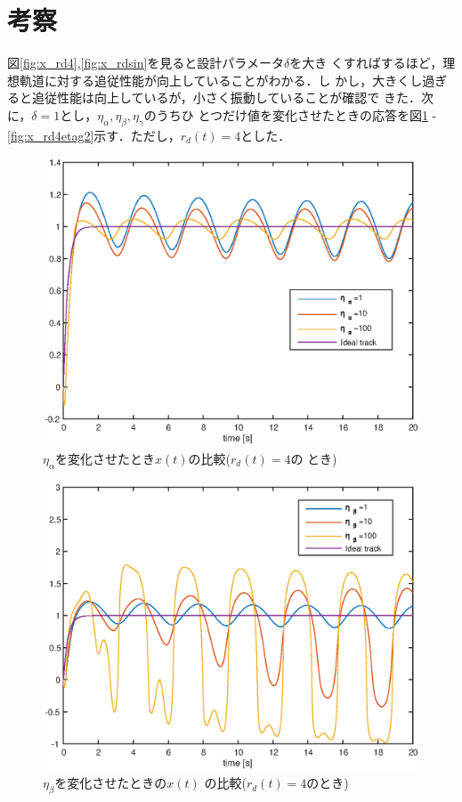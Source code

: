 \documentclass[a4paper,12pt]{jarticle}
\begin{document}
\section{考察}
図\ref{fig:x_rd4},\ref{fig:x_rdsin}を見ると設計パラメータ$\delta$を大き
くすればするほど，理想軌道に対する追従性能が向上していることがわかる．し
かし，大きくし過ぎると追従性能は向上しているが，小さく振動していることが確認で
きた．次に，$\delta=1$とし，$\eta_\alpha,\eta_\beta,\eta_\gamma$のうちひ
とつだけ値を変化させたときの応答を図\ref{fig:x_rd4etaa} - \ref{fig:x_rd4etag2}示す．ただし，$r_d(t)=4$とした．
%
\begin{figure}[b]
    \begin{center}
       \includegraphics[width=130mm]{fig/x_rd4_Etaa.eps}
        \caption{$\eta_\alpha$を変化させたとき$x(t)$の比較($r_d(t)=4$の
	 とき)}
        \label{fig:x_rd4etaa}
    \end{center}
\end{figure}
%
%
\begin{figure}[htb]
    \begin{center}
       \includegraphics[width=140mm]{fig/x_rd4_Etab.eps}
        \caption{$\eta_\beta$を変化させたときの$x(t)$
	 の比較($r_d(t)=4$のとき)}
        \label{fig:x_rd4etab}
    \end{center}
\end{figure}
\end{document}

